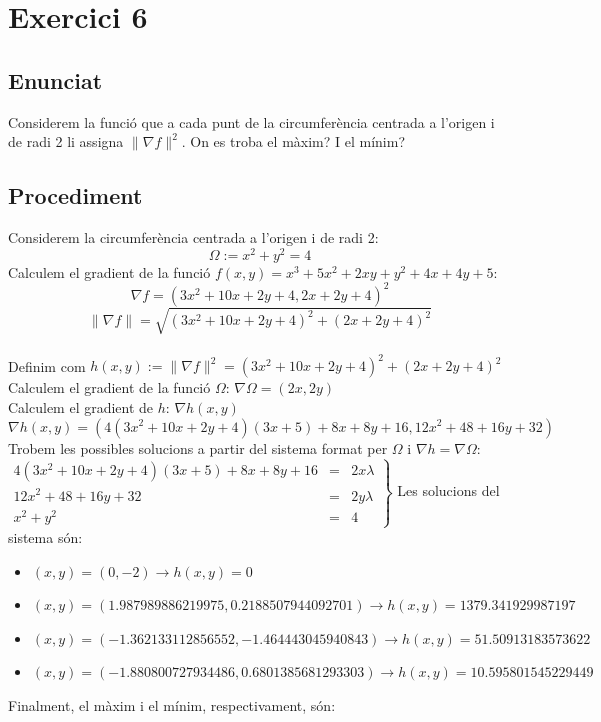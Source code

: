 \documentclass[12pt]{report}
\begin{document}
\chapter{Exercici 6}
\section{Enunciat}
Considerem la funció que a cada punt de la circumferència centrada a l'origen i de radi 2 li assigna $\parallel \nabla f \parallel ^2$. On es troba el màxim? I el mínim?

\section{Procediment}
Considerem la circumferència centrada a l'origen i de radi 2:
$$\Omega := x^2 + y^2 = 4$$
Calculem el gradient de la funció $f(x,y) = x^{3} + 5x^{2} + 2xy + y^{2} + 4x + 4y + 5$:
$$\nabla f = (3x^2 + 10x + 2y + 4, 2x + 2y + 4)^2  $$
$$ \parallel \nabla f\parallel = \sqrt{(3x^2 + 10x + 2y + 4)^2 + ( 2x + 2y + 4)^2 }$$\\
Definim com $h(x,y) := \parallel \nabla f\parallel^2 = (3x^2 + 10x + 2y + 4)^2 + ( 2x + 2y + 4)^2$\\
Calculem el gradient de la funció $\Omega$: $\nabla \Omega = (2x, 2y)$\\
Calculem el gradient de $h$: $\nabla h(x,y)$
$$\nabla h(x,y) = ( 4(3x^2 + 10x + 2y + 4)(3x + 5) + 8x + 8y + 16, 12x^2 + 48 + 16y + 32)$$
Trobem les possibles solucions a partir del sistema format per $\Omega$ i $\nabla h= \nabla \Omega$:
\newline
$\left.
\begin{array}{rcl}
    4(3x^2 + 10x + 2y + 4)(3x + 5) + 8x + 8y + 16 & = & 2x\lambda\\
    12x^2 + 48 + 16y + 32 & = & 2y\lambda \\
    x^2 + y^2 & = & 4
\end{array}
\right\}$
\newline
Les solucions del sistema són:
\begin{itemize}
    \item $(x,y) = (0,-2) \longrightarrow h(x,y) = 0$
    \item $(x,y) = (1.987989886219975,0.2188507944092701) \longrightarrow h(x,y) = 1379.341929987197$
    \item $(x,y) = (-1.362133112856552,-1.464443045940843) \longrightarrow h(x,y) = 51.50913183573622$
    \item $(x,y) = (-1.880800727934486,0.6801385681293303) \longrightarrow h(x,y) = 10.595801545229449$
\end{itemize}
Finalment, el màxim i el mínim, respectivament, són: 
\begin{center}
\end{center}
\end{document}
